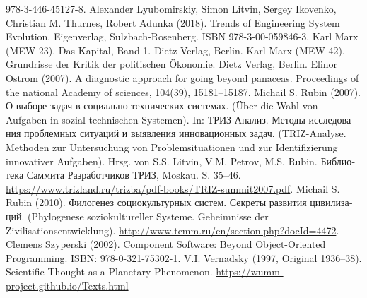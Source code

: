 \documentclass[11pt,a4paper]{article}
\begin{document}
\begin{thebibliography}{xxx}
  978-3-446-45127-8.
 Alexander Lyubomirskiy, Simon Litvin, Sergey Ikovenko,
  Christian M. Thurnes, Robert Adunka (2018). Trends of Engineering System
  Evolution. Eigenverlag, Sulzbach-Rosenberg.  ISBN 978-3-00-059846-3.
 Karl Marx (MEW 23). Das Kapital, Band 1. Dietz Verlag, Berlin.
 Karl Marx (MEW 42). Grundrisse der Kritik der politischen
  Ökonomie.  Dietz Verlag, Berlin.
 Elinor Ostrom (2007). A diagnostic approach for going
  beyond panaceas.  Proceedings of the national Academy of sciences, 104(39),
  15181--15187.
 Michail S. Rubin (2007). \foreignlanguage{russian}{О
  выборе задач в социально-технических системах}. (Über die Wahl von Aufgaben
  in sozial-technischen Systemen). In: \foreignlanguage{russian}{ТРИЗ Анализ.
    Методы исследования проблемных ситуаций и выявления инновационных
    задач}. (TRIZ-Analyse. Methoden zur Untersuchung von Problemsituationen
  und zur Identifizierung innovativer Aufgaben). Hrsg. von S.S. Litvin,
  V.M. Petrov, M.S. Rubin. \foreignlanguage{russian}{Библиотека Саммита
    Разработчиков ТРИЗ}, Moskau. S. 35--46.
  \url{https://www.trizland.ru/trizba/pdf-books/TRIZ-summit2007.pdf}.
 Michail S. Rubin
  (2010). \foreignlanguage{russian}{Филогенез социокультурных систем. Секреты
  развития цивилизаций}.  (Phylogenese soziokultureller Systeme. Geheimnisse
  der Zivilisationsentwicklung).
  \url{http://www.temm.ru/en/section.php?docId=4472}.
 Clemens Szyperski (2002). Component Software: Beyond
  Object-Oriented Programming. ISBN: 978-0-321-75302-1.
 V.I. Vernadsky (1997, Original 1936--38). Scientific
  Thought as a Planetary
  Phenomenon. \url{https://wumm-project.github.io/Texts.html}
\end{thebibliography}
\end{document}
